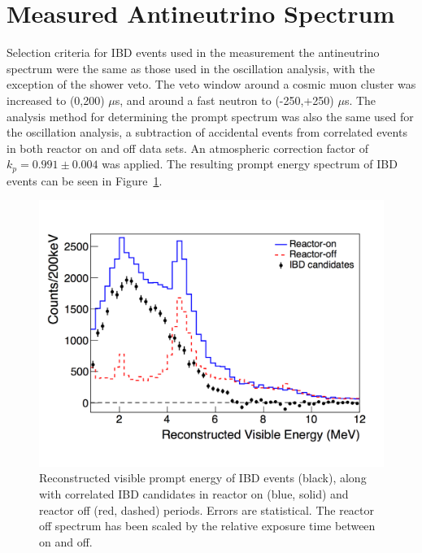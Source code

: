 \section{Measured Antineutrino Spectrum}

Selection criteria for IBD events used in the measurement the antineutrino spectrum were the same as those used in the oscillation analysis, with the exception of the shower veto.
The veto window around a cosmic muon cluster was increased to (0,200) $\mu$s, and around a fast neutron to (-250,+250) $\mu$s.
The analysis method for determining the prompt spectrum was also the same used for the oscillation analysis, a subtraction of accidental events from correlated events in both reactor on and off data sets.
An atmospheric correction factor of $k_p = 0.991 \pm 0.004$ was applied. 
The resulting prompt energy spectrum of IBD events can be seen in Figure~\ref{fig:spectrumresults}.


\begin{figure}[H]
	\centering
	\includegraphics[width=0.8\linewidth]{tex/7-oscillation-images/Spectrum}
	\caption{Reconstructed visible prompt energy of IBD events (black), along with correlated IBD candidates in reactor on (blue, solid) and reactor off (red, dashed) periods. Errors are statistical. The reactor off spectrum has been scaled by the relative exposure time between on and off. \cite{Ashenfelter:2018jrx}}
	\label{fig:spectrumresults}
\end{figure}



